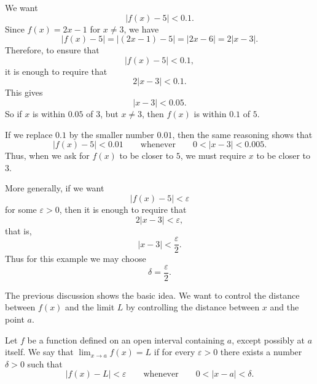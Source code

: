 \begin{solution}
We want
\[
|f(x)-5|<0.1.
\]
Since \(f(x)=2x-1\) for \(x\ne 3\), we have
\[
|f(x)-5|
=
|(2x-1)-5|
=
|2x-6|
=
2|x-3|.
\]
Therefore, to ensure that
\[
|f(x)-5|<0.1,
\]
it is enough to require that
\[
2|x-3|<0.1.
\]
This gives
\[
|x-3|<0.05.
\]
So if \(x\) is within \(0.05\) of \(3\), but \(x\ne 3\), then \(f(x)\) is within \(0.1\) of \(5\).
\end{solution}

If we replace \(0.1\) by the smaller number \(0.01\), then the same reasoning shows that
\[
|f(x)-5|<0.01
\qquad \text{whenever} \qquad
0<|x-3|<0.005.
\]
Thus, when we ask for \(f(x)\) to be closer to \(5\), we must require \(x\) to be closer to \(3\).

More generally, if we want
\[
|f(x)-5|<\varepsilon
\]
for some \(\varepsilon>0\), then it is enough to require that
\[
2|x-3|<\varepsilon,
\]
that is,
\[
|x-3|<\frac{\varepsilon}{2}.
\]
Thus for this example we may choose
\[
\delta=\frac{\varepsilon}{2}.
\]

The previous discussion shows the basic idea. We want to control the distance between \(f(x)\) and the limit \(L\) by controlling the distance between \(x\) and the point \(a\).

\begin{definition}
Let \(f\) be a function defined on an open interval containing \(a\), except possibly at \(a\) itself. We say that
\(\displaystyle
\lim_{x\to a} f(x)=L
\)
if for every \(\varepsilon>0\) there exists a number \(\delta>0\) such that
\[
|f(x)-L|<\varepsilon
\qquad \text{whenever} \qquad
0<|x-a|<\delta.
\]
\end{definition}

